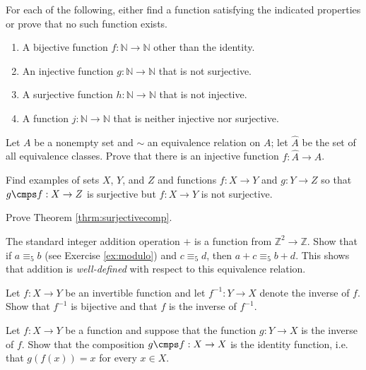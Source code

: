 \begin{exercise}
For each of the following, either find a function satisfying the indicated properties or prove that no such function exists.
\begin{enumerate}
\item A bijective function $f:\mathbb N\to \mathbb N$ other than the identity.

\item An injective function $g:\mathbb N\to \mathbb N$ that is not surjective.

\item A surjective function $h:\mathbb N\to \mathbb N$ that is not injective.

\item A function $j:\mathbb N\to \mathbb N$ that is neither injective nor surjective.
\end{enumerate}
\end{exercise}

\begin{exercise}\label{exer:equivinject}
Let $A$ be a nonempty set and $\sim$ an equivalence relation on $A$; let $\widehat A$ be the set of all equivalence classes. Prove that there is an injective function $f:\widehat A\to A$.
\end{exercise}

\begin{exercise}
Find examples of sets $X$, $Y$, and $Z$ and functions $f:X\to Y$ and $g:Y\to Z$ so that $g\cmps f:X\to Z$ is surjective but $f:X\to Y$ is not surjective.
\end{exercise}

\begin{exercise}
Prove Theorem \ref{thrm:surjectivecomp}.
\end{exercise}

\begin{exercise}
The standard integer addition operation $+$ is a function from $\mathbb Z^2\to\mathbb Z$.  Show that if $a \equiv_5 b$ (see Exercise \ref{ex:modulo}) and $c\equiv_5 d$, then $a+c\equiv_5 b+d$.  This shows that addition is \emph{well-defined} with respect to this equivalence relation.
\end{exercise}

\begin{exercise}\label{ex:inverses}
Let $f:X\to Y$ be an invertible function and let $f^{-1}:Y\to X$ denote the inverse of $f$.  Show that $f^{-1}$ is bijective and that $f$ is the inverse of $f^{-1}$.
\end{exercise}

\begin{exercise}
Let $f:X\to Y$ be a function and suppose that the function $g:Y\to X$ is the inverse of $f$. Show that the composition $g\cmps f:X\to X$ is the identity function, i.e. that $g(f(x))=x$ for every $x\in X$.
\end{exercise}


